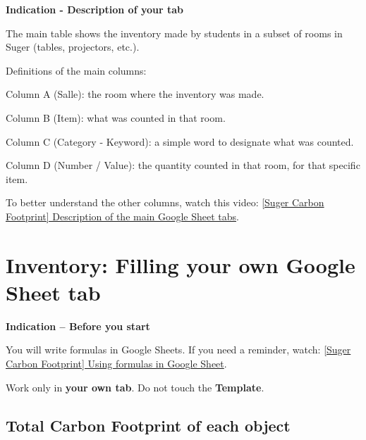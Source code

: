 \documentclass{exam}
\begin{document}
\begin{Indication}
  \textbf{Indication - Description of your tab}
  \begin{compactitem}
    \item The main table shows the inventory made by students in a subset of rooms in Suger (tables, projectors, etc.).
    \item Definitions of the main columns:
    \begin{compactitem}
      \item Column A (Salle): the room where the inventory was made.
      \item Column B (Item): what was counted in that room.
      \item Column C (Category - Keyword): a simple word to designate what was counted.
      \item Column D (Number / Value): the quantity counted in that room, for that specific item.
    \end{compactitem}
    \item To better understand the other columns, watch this video:
    \href{https://www.loom.com/share/01b4986befa84a109330f6ea4e52b666}{[Suger Carbon Footprint] Description of the main Google Sheet tabs}.
  \end{compactitem}
\end{Indication}

\section{Inventory: Filling your own Google Sheet tab}

\begin{Indication}
\textbf{Indication -- Before you start}
\begin{compactitem}
  \item You will write formulas in Google Sheets. If you need a reminder, watch:
  \href{https://www.loom.com/share/36719b97cfb243b8a52dcccf79004bbb}{[Suger Carbon Footprint] Using formulas in Google Sheet}.
  \item Work only in \textbf{your own tab}. Do not touch the \textbf{Template}.
\end{compactitem}
\end{Indication}

\subsection{Total Carbon Footprint of each object}
\end{document}
